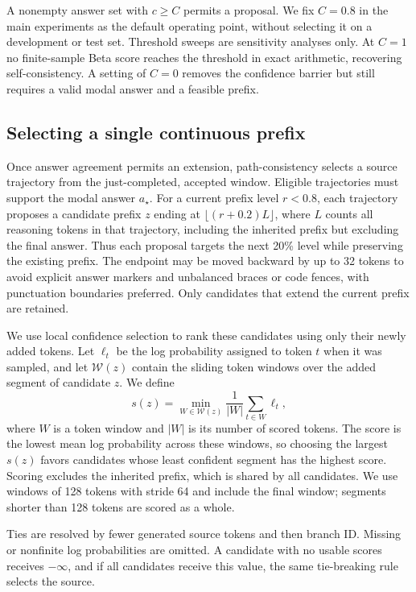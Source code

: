 A nonempty answer set with $c\geq C$ permits a proposal. We fix $C=0.8$ in the main experiments as the default operating point, without selecting it on a development or test set. Threshold sweeps are sensitivity analyses only. At $C=1$ no finite-sample Beta score reaches the threshold in exact arithmetic, recovering self-consistency. A setting of $C=0$ removes the confidence barrier but still requires a valid modal answer and a feasible prefix.

\subsection{Selecting a single continuous prefix}
Once answer agreement permits an extension, path-consistency selects a source trajectory from the just-completed, accepted window. Eligible trajectories must support the modal answer $a_\star$. For a current prefix level $r<0.8$, each trajectory proposes a candidate prefix $z$ ending at $\lfloor(r+0.2)L\rfloor$, where $L$ counts all reasoning tokens in that trajectory, including the inherited prefix but excluding the final answer. Thus each proposal targets the next 20\% level while preserving the existing prefix. The endpoint may be moved backward by up to 32 tokens to avoid explicit answer markers and unbalanced braces or code fences, with punctuation boundaries preferred. Only candidates that extend the current prefix are retained.

We use local confidence selection to rank these candidates using only their newly added tokens. Let $\ell_t$ be the log probability assigned to token $t$ when it was sampled, and let $\mathcal W(z)$ contain the sliding token windows over the added segment of candidate $z$. We define
\begin{equation}
 s(z)=\min_{W\in\mathcal W(z)}\frac{1}{|W|}\sum_{t\in W}\ell_t,
 \label{eq:blc}
\end{equation}
where $W$ is a token window and $|W|$ is its number of scored tokens. The score is the lowest mean log probability across these windows, so choosing the largest $s(z)$ favors candidates whose least confident segment has the highest score. Scoring excludes the inherited prefix, which is shared by all candidates. We use windows of 128 tokens with stride 64 and include the final window; segments shorter than 128 tokens are scored as a whole.

Ties are resolved by fewer generated source tokens and then branch ID. Missing or nonfinite log probabilities are omitted. A candidate with no usable scores receives $-\infty$, and if all candidates receive this value, the same tie-breaking rule selects the source.

